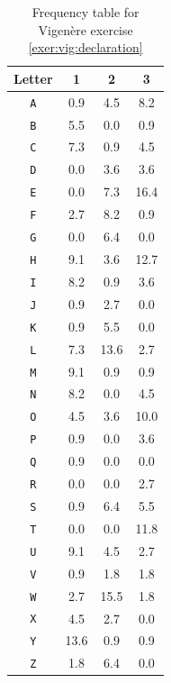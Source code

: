 \documentclass{book}
\theoremstyle{plain}
\theoremstyle{definition}
\newcommand{\ciphertext}[1]{\texttt{#1}} %
\begin{document}
\begin{table}[H]
\begin{center}
\begin{tabular}{c|ccc}
Letter & 1 & 2 & 3 \\
\hline
\ciphertext{A} & 0.9 & 4.5 & 8.2 \\
\ciphertext{B} & 5.5 & 0.0 & 0.9 \\
\ciphertext{C} & 7.3 & 0.9 & 4.5 \\
\ciphertext{D} & 0.0 & 3.6 & 3.6 \\
\ciphertext{E} & 0.0 & 7.3 & 16.4 \\
\ciphertext{F} & 2.7 & 8.2 & 0.9 \\
\ciphertext{G} & 0.0 & 6.4 & 0.0 \\
\ciphertext{H} & 9.1 & 3.6 & 12.7 \\
\ciphertext{I} & 8.2 & 0.9 & 3.6 \\
\ciphertext{J} & 0.9 & 2.7 & 0.0 \\
\ciphertext{K} & 0.9 & 5.5 & 0.0 \\
\ciphertext{L} & 7.3 & 13.6 & 2.7 \\
\ciphertext{M} & 9.1 & 0.9 & 0.9 \\
\ciphertext{N} & 8.2 & 0.0 & 4.5 \\
\ciphertext{O} & 4.5 & 3.6 & 10.0 \\
\ciphertext{P} & 0.9 & 0.0 & 3.6 \\
\ciphertext{Q} & 0.9 & 0.0 & 0.0 \\
\ciphertext{R} & 0.0 & 0.0 & 2.7 \\
\ciphertext{S} & 0.9 & 6.4 & 5.5 \\
\ciphertext{T} & 0.0 & 0.0 & 11.8 \\
\ciphertext{U} & 9.1 & 4.5 & 2.7 \\
\ciphertext{V} & 0.9 & 1.8 & 1.8 \\
\ciphertext{W} & 2.7 & 15.5 & 1.8 \\
\ciphertext{X} & 4.5 & 2.7 & 0.0 \\
\ciphertext{Y} & 13.6 & 0.9 & 0.9 \\
\ciphertext{Z} & 1.8 & 6.4 & 0.0
\end{tabular}
\caption{Frequency table for Vigen\`{e}re exercise \ref{exer:vig:declaration}}
\label{app:vig:declaration}
\end{center}
\end{table}
\end{document}
